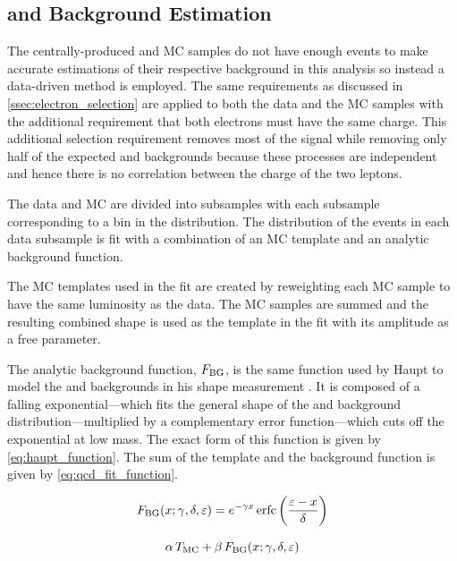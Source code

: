 \subsection{\texorpdfstring{\QCDjets and \wjets}{QCD multi-jet and W+Jets} Background Estimation}
\label{ssec:qcd_background}

The centrally-produced \QCDjets and \wjets MC samples do not have enough events
to make accurate estimations of their respective background in this analysis so
instead a data-driven method is employed. The same requirements as discussed in
\cref{ssec:electron_selection} are applied to both the data and the MC
samples with the additional requirement that both electrons must have the same
charge. This additional selection requirement removes most of the signal while
removing only half of the expected \QCDjets and \wjets backgrounds because
these processes are independent and hence there is no correlation between the
charge of the two leptons.

The data and MC are divided into subsamples with each subsample corresponding
to a bin in the \phistar distribution. The \mee distribution of the events in
each data subsample is fit with a combination of an MC template and an analytic
background function.

The MC templates used in the fit are created by reweighting each MC sample to
have the same luminosity as the data. The MC samples are summed and the
resulting combined shape is used as the template in the fit with its amplitude
as a free parameter.

The analytic background function, $F_{\text{BG}}$, is the same function used by
Haupt to model the \QCDjets and \wjets backgrounds in his \Ztoee shape
measurement \cite{haupt_2011}. It is composed of a falling exponential---which
fits the general shape of the \QCDjets and \wjets background
distribution---multiplied by a complementary error function---which cuts off
the exponential at low mass. The exact form of this function is given by
\cref{eq:haupt_function}. The sum of the template and the background
function is given by \cref{eq:qcd_fit_function}.

\begin{equation}\label{eq:haupt_function}
    F_{\text{BG}}(x; \gamma, \delta, \varepsilon) = e^{- \gamma x} \operatorname{erfc} \left( \frac{\varepsilon - x}{\delta} \right)
\end{equation}

\begin{equation}\label{eq:qcd_fit_function}
    \alpha \, T_{\text{MC}} + \beta \, F_{\text{BG}}(x; \gamma, \delta, \varepsilon)
\end{equation}

